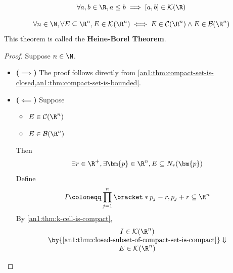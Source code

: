 \begin{corollary} \label{an1:cor:closed-interval-in-R-is-compact}
  \[
    \forall a, b \in \R, a \leq b \implies [a, b] \in \mathcal{K}(\R)
  \]
\end{corollary}

\begin{theorem} \label{an1:thm:heine-borel-theorem}
  \[
    \forall n \in \N, \forall E \subseteq \R^{n}, E \in \mathcal{K}(\R^{n})
    \iff E \in \mathcal{C}(\R^{n}) \land E \in \mathcal{B}(\R^{n})
  \]
  This theorem is called the \textbf{Heine-Borel Theorem}.
\end{theorem}

\begin{proof}
  Suppose $n \in \N$.
  \begin{itemize}
    \item \textbf{($\implies$)} The proof follows directly from
          \cref{an1:thm:compact-set-is-closed,an1:thm:compact-set-is-bounded}.
    \item \textbf{($\impliedby$)} Suppose
          \begin{itemize}
            \item $E \in \mathcal{C}(\R^{n})$
            \item $E \in \mathcal{B}(\R^{n})$
          \end{itemize}
          Then
          \[
            \exists r \in \R^{+}, \exists \bm{p} \in \R^{n}, E \subseteq N_{r}(\bm{p})
          \]
          Define
          \[
            I \coloneqq \prod_{j = 1}^{n} \bracket*{p_{j} - r, p_{j} + r} \subseteq \R^{n}
          \]
          By \cref{an1:thm:k-cell-is-compact},
          \[
            \begin{array}{c}
              I \in \mathcal{K}(\R^{n})                                              \\
              \by{\Cref{an1:thm:closed-subset-of-compact-set-is-compact}} \Downarrow \\
              E \in \mathcal{K}(\R^{n})
            \end{array}
          \]
  \end{itemize}
\end{proof}
